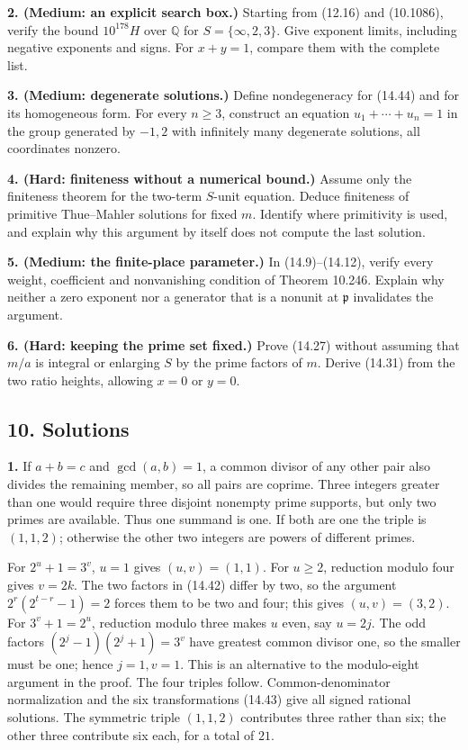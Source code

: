 \documentclass[
  11pt,
  a4paper,
]{article}
\newcounter{none} %
\begin{document}
\textbf{2. (Medium: an explicit search box.)} Starting from (12.16) and
(10.1086), verify the bound \(10^{178}H\) over \(\mathbb Q\) for
\(S=\{\infty,2,3\}\). Give exponent limits, including negative exponents
and signs. For \(x+y=1\), compare them with the complete list.

\textbf{3. (Medium: degenerate solutions.)} Define nondegeneracy for
(14.44) and for its homogeneous form. For every \(n\ge3\), construct an
equation \(u_1+\cdots+u_n=1\) in the group generated by \(-1,2\) with
infinitely many degenerate solutions, all coordinates nonzero.

\textbf{4. (Hard: finiteness without a numerical bound.)} Assume only
the finiteness theorem for the two-term \(S\)-unit equation. Deduce
finiteness of primitive Thue--Mahler solutions for fixed \(m\). Identify
where primitivity is used, and explain why this argument by itself does
not compute the last solution.

\textbf{5. (Medium: the finite-place parameter.)} In (14.9)--(14.12),
verify every weight, coefficient and nonvanishing condition of Theorem
10.246. Explain why neither a zero exponent nor a generator that is a
nonunit at \(\mathfrak p\) invalidates the argument.

\textbf{6. (Hard: keeping the prime set fixed.)} Prove (14.27) without
assuming that \(m/a\) is integral or enlarging \(S\) by the prime
factors of \(m\). Derive (14.31) from the two ratio heights, allowing
\(x=0\) or \(y=0\).

\subsection{10. Solutions}\label{solutions}

\textbf{1.} If \(a+b=c\) and \(\gcd(a,b)=1\), a common divisor of any
other pair also divides the remaining member, so all pairs are coprime.
Three integers greater than one would require three disjoint nonempty
prime supports, but only two primes are available. Thus one summand is
one. If both are one the triple is \((1,1,2)\); otherwise the other two
integers are powers of different primes.

For \(2^u+1=3^v\), \(u=1\) gives \((u,v)=(1,1)\). For \(u\ge2\),
reduction modulo four gives \(v=2k\). The two factors in (14.42) differ
by two, so the argument \(2^r(2^{t-r}-1)=2\) forces them to be two and
four; this gives \((u,v)=(3,2)\). For \(3^v+1=2^u\), reduction modulo
three makes \(u\) even, say \(u=2j\). The odd factors
\((2^j-1)(2^j+1)=3^v\) have greatest common divisor one, so the smaller
must be one; hence \(j=1,v=1\). This is an alternative to the
modulo-eight argument in the proof. The four triples follow.
Common-denominator normalization and the six transformations (14.43)
give all signed rational solutions. The symmetric triple \((1,1,2)\)
contributes three rather than six; the other three contribute six each,
for a total of \(21\).
\end{document}
